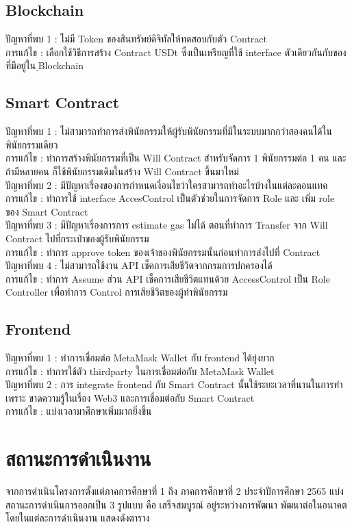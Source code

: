\documentclass[12pt,oneside,openright,a4paper]{cpe-thai-project}
\begin{document}
\subsection{Blockchain}
\tab ปัญหาที่พบ 1 : ไม่มี Token ของสินทรัพย์ดิจิทัลให้ทดสอบกับตัว Contract \\
\tab การแก้ไข : เลือกใช้วิธีการสร้าง Contract USDt ซึ่งเป็นเหรียญที่ใช้ interface ตัวเดียวกันกับของที่มีอยู่ใน ฺBlockchain
\subsection{Smart Contract}
\tab ปัญหาที่พบ 1 : ไม่สามารถทำการส่งพินัยกรรมให้ผู้รับพินัยกรรมที่มีในระบบมากกว่าสองคนได้ใน พินัยกรรมเดียว\\
\tab การแก้ไข : ทำการสร้างพินัยกรรมที่เป็น Will Contract สำหรับจัดการ 1 พินัยกรรมต่อ 1 คน และถ้ามีหลายคน ก็ใช้พินัยกรรมเดิมในสร้าง Will Contract ขึ้นมาใหม่\\
\tab ปัญหาที่พบ 2 : มีปัญหาเรื่องของการกำหนดเงื่อนไขว่าใครสามารถทำอะไรบ้างในแต่ละคอนแทค\\
\tab การแก้ไข : ทำการใช้ interface AccesControl เป็นตัวช่วยในการจัดการ Role และ เพิ่ม role ของ Smart Contract\\
\tab ปัญหาที่พบ 3 : มีปัญหาเรื่องการการ estimate gas ไม่ได้ ตอนที่ทำการ Transfer จาก Will Contract ไปที่กระเป๋าของผู้รับพินัยกรรม\\
\tab การแก้ไข : ทำการ approve token ของเจ้าของพินัยกรรมนั้นก่อนทำการส่งไปที่ Contract\\
\tab ปัญหาที่พบ 4 : ไม่สามารถใช้งาน API เช็คการเสียชีวิตจากกรมการปกครองได้\\
\tab การแก้ไข : ทำการ Assume ส่วน API เช็คการเสียชีวิตแทนด้วย AccessControl เป็น Role Controller เพื่อทำการ Control การเสียชีวิตของผู้ทำพินัยกรรม
\subsection{Frontend}
\tab ปัญหาที่พบ 1 : ทำการเชื่อมต่อ MetaMask Wallet กับ frontend ได้ยุ่งยาก\\
\tab การแก้ไข : ทำการใช้ตัว thirdparty ในการเชื่อมต่อกับ MetaMask Wallet\\
\tab ปัญหาที่พบ 2 : การ integrate frontend กับ Smart Contract นั้นใช้ระยะเวลาที่นานในการทำ เพราะ ขาดความรู้ในเรื่อง Web3 และการเชื่อมต่อกับ Smart Contract\\
\tab การแก้ไข : แบ่งเวลามาศึกษาเพิ่มมากยิ่งขึ้น

\clearpage
\section{สถานะการดำเนินงาน}
\tab จากการดำเนินโครงการตั้งแต่ภาคการศึกษาที่ 1 ถึง ภาคการศึกษาที่ 2 ประจำปีการศึกษา 2565 แบ่งสถานะการดำเนินการออกเป็น 3 รูปแบบ คือ เสร็จสมบูรณ์ อยู่ระหว่างการพัฒนา พัฒนาต่อในอนาคต โดยในแต่ละการดำเนินงาน แสดงดังตาราง
\end{document}
